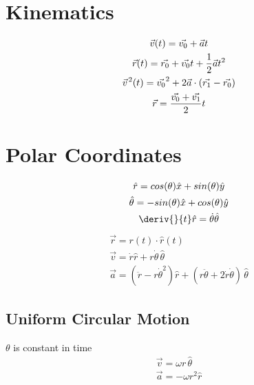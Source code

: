 \documentclass{notes}
\numberwithin{equation}{subsection}
\begin{document}
\section{Kinematics}

\begin{gather}
    \vec{v}(t) = \vec{v_0} + \vec{a} t\\
    \vec{r}(t) = \vec{r_0} + \vec{v_0} t + \frac{1}{2} \vec{a} t^2\\
    \vec{v}^{\hspace*{1px}2}(t) = \vec{v_0}^2 + 2 \vec{a} \cdot (\vec{r_1} - \vec{r_0})\\
    \vec{r} = \frac{\vec{v_0}+ \vec{v_1}}{2}t
\end{gather}

\section{Polar Coordinates}
\begin{gather}
    \hat{r} = cos(\theta)\hat{x}+sin(\theta)\hat{y}\\
    \hat{\theta} = -sin(\theta)\hat{x}+cos(\theta)\hat{y}\\
    \deriv{}{t}\hat{r} = \dot{\theta}\hat{\theta}
\end{gather}
\begin{gather}
    \vec{r} = r(t) \cdot \hat{r}(t)\\
    \vec{v} = \dot{r}\hat{r} +r\dot{\theta} \, \hat{\theta}\\
    \vec{a} = (\ddot{r}-r\dot{\theta}^2)\hat{r} + (r\ddot{\theta} + 2\dot{r}\dot{\theta})\, \hat{\theta}
\end{gather}

\subsection{Uniform Circular Motion}
\(\theta\) is constant in time
\begin{gather}
    \vec{v} = \omega r \, \hat{\theta}\\
    \vec{a} = -\omega r^2 \hat{r}
\end{gather}
\end{document}
